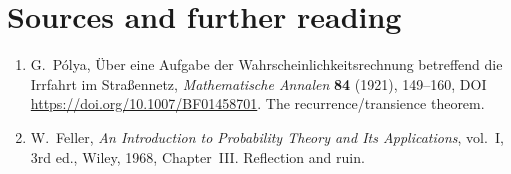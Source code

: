 \section*{Sources and further reading}

\begin{enumerate}
\item G.~P\'olya, \"Uber eine Aufgabe der Wahrscheinlichkeitsrechnung betreffend die Irrfahrt im Stra\ss ennetz, \emph{Mathematische Annalen} \textbf{84} (1921), 149--160, DOI \url{https://doi.org/10.1007/BF01458701}. The recurrence/transience theorem.
\item W.~Feller, \emph{An Introduction to Probability Theory and Its Applications}, vol.~I, 3rd ed., Wiley, 1968, Chapter~III. Reflection and ruin.
\end{enumerate}
